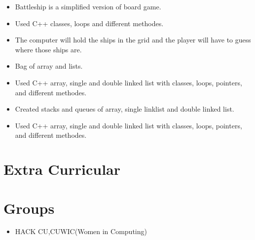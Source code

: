 \documentclass[10pt,a4paper,sans]{moderncv} %
\begin{document}
\begin{itemize}
\vspace{-5mm}
\item{Battleship is a simplified version of board game.}
\item{Used C++ classes, loops and different methodes.}
\item{The computer will hold the ships in the grid and the player will have to guess where those ships are.}
\end{itemize}
\begin{itemize}
\vspace{-5mm}
\item{Bag of array and lists.}
\item{Used C++ array, single and double linked list with classes, loops, pointers, and different methodes.}
\end{itemize}
\begin{itemize}
\vspace{-5mm}
\item{Created stacks and queues of array, single linklist and double linked list.}
\item{Used C++ array, single and double linked list with classes, loops, pointers, and different methodes.}
\end{itemize}
\vspace{-5mm}
\section{Extra Curricular}
\begin{tasks}
\end{tasks}

\section{Groups}
\begin{itemize}
\item {}{HACK CU,CUWIC(Women in Computing)}
\end{itemize}

\end{document}
